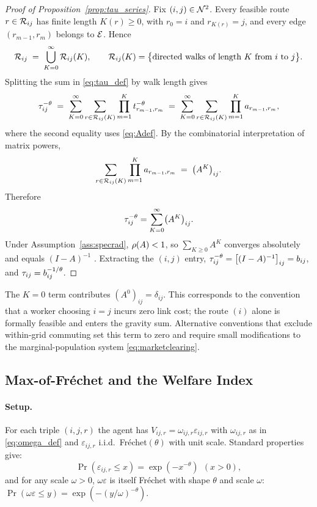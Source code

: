 \begin{proof}[Proof of Proposition~\ref{prop:tau_series}]
Fix $(i,j)\in\mathcal N^2$.  Every feasible route $r\in\mathcal R_{ij}$ has finite
length $K(r)\ge 0$, with $r_0=i$ and $r_{K(r)}=j$, and every edge
$(r_{m-1},r_m)$ belongs to $\mathcal E$.  Hence
\[
  \mathcal R_{ij}
  \;=\;\bigcup_{K=0}^{\infty}\mathcal R_{ij}(K),
  \qquad
  \mathcal R_{ij}(K)=\bigl\{\text{directed walks of length $K$ from $i$ to $j$}\bigr\}.
\]
Splitting the sum in \eqref{eq:tau_def} by walk length gives
\[
  \tau_{ij}^{-\theta}
  \;=\;\sum_{K=0}^{\infty}\sum_{r\in\mathcal R_{ij}(K)}
       \prod_{m=1}^{K}t_{r_{m-1},r_m}^{-\theta}
  \;=\;\sum_{K=0}^{\infty}\sum_{r\in\mathcal R_{ij}(K)}
       \prod_{m=1}^{K}a_{r_{m-1},r_m},
\]
where the second equality uses \eqref{eq:Adef}.  By the
combinatorial interpretation of matrix powers,
\[
  \sum_{r\in\mathcal R_{ij}(K)}\prod_{m=1}^{K}a_{r_{m-1},r_m}
  \;=\;\bigl(A^{K}\bigr)_{ij}.
\]
Therefore
\[
  \tau_{ij}^{-\theta}=\sum_{K=0}^{\infty}\bigl(A^{K}\bigr)_{ij}.
\]
Under Assumption~\ref{ass:specrad}, $\rho(A)<1$, so
$\sum_{K\ge0}A^{K}$ converges absolutely and equals $(I-A)^{-1}$
\cite[see, e.g.,]{AllenArkolakis2022}.  Extracting the $(i,j)$ entry,
$\tau_{ij}^{-\theta}=\bigl[(I-A)^{-1}\bigr]_{ij}=b_{ij}$, and
$\tau_{ij}=b_{ij}^{-1/\theta}$.
\end{proof}

\begin{remark}
The $K=0$ term contributes $(A^{0})_{ij}=\delta_{ij}$.  This corresponds
to the convention that a worker choosing $i=j$ incurs zero link
cost; the route $(i)$ alone is formally feasible and enters the
gravity sum.  Alternative conventions that exclude within-grid
commuting set this term to zero and require small modifications to
the marginal-population system \eqref{eq:marketclearing}.
\end{remark}

\subsection{Max-of-Fr\'echet and the Welfare Index}\label{app:welfare}

\paragraph{Setup.}
For each triple $(i,j,r)$ the agent has $V_{ij,r}=\omega_{ij,r}
\varepsilon_{ij,r}$ with $\omega_{ij,r}$ as in \eqref{eq:omega_def}
and $\varepsilon_{ij,r}$ i.i.d.\ Fr\'echet$(\theta)$ with unit scale.
Standard properties give:
\[
  \Pr(\varepsilon_{ij,r}\le x)=\exp(-x^{-\theta})\ \ (x>0),
\]
and for any scale $\omega>0$, $\omega\varepsilon$ is itself Fr\'echet
with shape $\theta$ and scale $\omega$:
$\Pr(\omega\varepsilon\le y)=\exp(-(y/\omega)^{-\theta})$.

